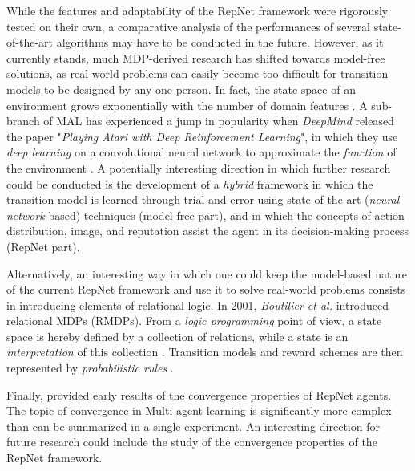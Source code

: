 
While the features and adaptability of the RepNet framework were rigorously tested on their own, a comparative analysis of the performances of several state-of-the-art algorithms may have to be conducted in the future. However, as it currently stands, much MDP-derived research has shifted towards model-free solutions, as real-world problems can easily become too difficult for transition models to be designed by any one person. In fact, the state space of an environment grows exponentially with the number of domain features \cite{bout2}. A sub-branch of MAL has experienced a jump in popularity when \textit{DeepMind} released the paper "\textit{Playing Atari with Deep Reinforcement Learning}", in which they use \textit{deep learning} on a convolutional neural network to approximate the \textit{function} of the environment \cite{DQN}. A potentially interesting direction in which further research could be conducted is the development of a \textit{hybrid} framework in which the transition model is learned through trial and error using state-of-the-art (\textit{neural network}-based) techniques (model-free part), and in which the concepts of action distribution, image, and reputation assist the agent in its decision-making process (RepNet part).




Alternatively, an interesting way in which one could keep the model-based nature of the current RepNet framework and use it to solve real-world problems consists in introducing elements of relational logic. In 2001, \textit{Boutilier et al.} \cite{bout2} introduced relational MDPs (RMDPs). From a \textit{logic programming} point of view, a state space is hereby defined by a collection of relations, while a state is an \textit{interpretation} of this collection \cite{relationallogic}. Transition models and reward schemes are then represented by \textit{probabilistic rules} \cite{Nitti2017}.





Finally,  provided early results of the convergence properties of RepNet agents. The topic of convergence in Multi-agent learning is significantly more complex than can be summarized in a single experiment. An interesting direction for future research could include the study of the convergence properties of the RepNet framework.